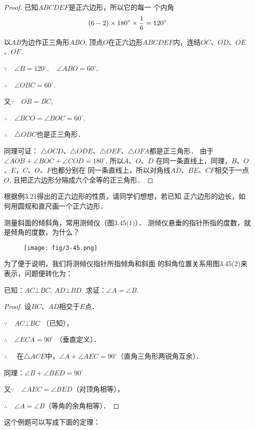 \begin{proof}
    已知$ABCDEF$是正六边形，所以它的每一
    个内角
    \[(6-2)\times180^{\circ} \times\dfrac{1}{6}=120^{\circ}\]
    
    以$\overline{AB}$为边作正三角形$ABO$, 顶点$O$在正六边形$ABCD
    EF$内，连结$\overline{OC}$、$\overline{OD}$、$\overline{OE}$、$\overline{OF}$.

$\because\quad \angle B=120^{\circ},\quad \angle ABO=60^{\circ}$,
 
$\therefore\quad \angle OBC=60^{\circ}$.

又$\because\quad \overline{OB}=\overline{BC}$,

$\therefore\quad \angle BCO=\angle BOC=60^{\circ}$.

$\therefore\quad \triangle OBC$也是正三角形．

    同理可证：
$\triangle OCD$、$\triangle ODE$、$\triangle OEF$、$\triangle OFA$都是正三角形．
    由于$\angle AOB+\angle BOC+\angle COD=180^{\circ}$, 所以$A$、$O$、$D$
    在同一条直线上，同理，$B$、$O$、$E$，$C$、$O$、$F$也都分别在
    同一条直线上，所以对角线$\overline{AD}$、$\overline{BE}$、$\overline{CF}$相交于一点$O$, 
    且把正六边形分隔成六个全等的正三角形．
\end{proof}


    根据例3.21得出的正六边形的性质，请同学们想想，若已知
    正六边形的边长，如何用圆规和直尺画一个正六边形．
    


\begin{example}
    测量斜面的倾斜角，常用测倾仪（图3.45(1)）．
测倾仪悬垂的指针所指的度数，就是倾角的度数，为什么？
\begin{figure}[htp]
    \centering
\texttt{[image: fig/3-45.png]}
    \caption{}
\end{figure}
\end{example}


\begin{analyze}
    为了便于说明，我们将测倾仪指针所指倾角和斜面
    的斜角位置关系用图3.45(2)来表示，问题便转化为：

    已知：$AC\bot BC$, $AD\bot BD$. 求证：$\angle A=\angle B$.
\end{analyze}

\begin{proof}
    设$BC$、$AD$相交于$E$点．

$\because\quad AC\bot BC$  （已知），

$\therefore\quad \angle ECA=90^{\circ}$ （垂直定义）．

$\therefore\quad$ 在$\triangle ACE$中，$\angle A+\angle AEC=90^{\circ}$（直角三角形两锐角互余）．

同理：$\angle B+\angle BED=90^{\circ}$

又$\because\quad \angle AEC=\angle BED$（对顶角相等），

$\therefore\quad \angle A=\angle B$（等角的余角相等）．
\end{proof}
这个例题可以写成下面的定理：

